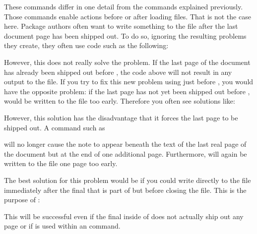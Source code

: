 \begin{Declaration}
\end{Declaration}%
These commands differ in one detail from the commands explained previously.
Those commands enable actions before or after loading files. That is not the
case here. Package authors often want to write something to the 
file after the last document page has been shipped out. To do so, ignoring the
resulting problems they create, they often use code such as the following:
\begin{lstcode}
  \AtEndDocument{%
    \if@filesw
      \write\@auxout{%
        \protect\writethistoaux%
      }%
    \fi
  } 
\end{lstcode}
However, this does not really solve the problem. If the last page of the
document has already been shipped out before ,
the code above will not result in any output to the  file. If you
try to fix this new problem using  just before ,
you would have the opposite problem: if the last page has not yet been shipped
out before ,  would be
written to the  file too early. Therefore you often see solutions
like:
\begin{lstcode}
  \AtEndDocument{%
    \if@filesw
      \clearpage
      \immediate\write\@auxout{%
        \protect\writethistoaux%
      }%
    \fi
  } 
\end{lstcode}
However, this solution has the disadvantage that it forces the last page to be
shipped out. A command such as
\begin{lstcode}
\end{lstcode}
will no longer cause the note to appear beneath the text of the last real page
of the document but at the end of one additional page. Furthermore,
 will again be written to the  file one page
too early.

The best solution for this problem would be if you could write directly to the
 file immediately after the final 
that is part of  but before closing the
 file. This is the purpose of :
\begin{lstcode}
  \BeforeClosingMainAux{%
    \if@filesw
      \immediate\write\@auxout{%
        \protect\writethistoaux%
      }%
    \fi
  }
\end{lstcode}
This will be successful even if the final 
inside of  does not actually ship out any page
or if  is used within an 
command.

